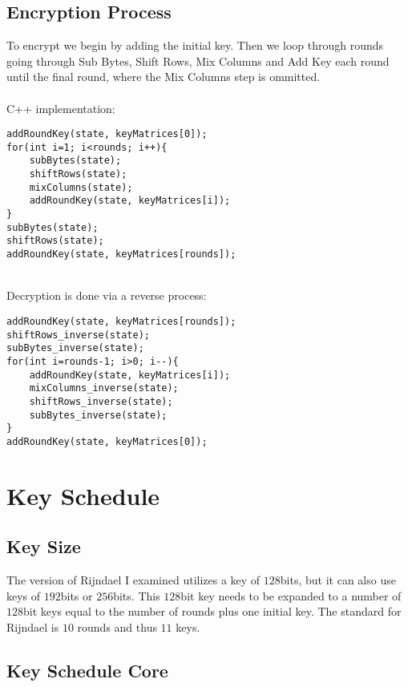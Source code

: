 \documentclass{article}
\begin{document}
\subsection{Encryption Process}
To encrypt we begin by adding the initial key.  Then we loop through rounds going through Sub Bytes, Shift Rows, Mix Columns and Add Key each round until the final round, where the Mix Columns step is ommitted.\\\\
C++ implementation:
\begin{lstlisting}
addRoundKey(state, keyMatrices[0]);
for(int i=1; i<rounds; i++){
    subBytes(state);
    shiftRows(state);
    mixColumns(state);
    addRoundKey(state, keyMatrices[i]);
}
subBytes(state);
shiftRows(state);
addRoundKey(state, keyMatrices[rounds]);
\end{lstlisting}
\hfill\\
Decryption is done via a reverse process:
\begin{lstlisting}
addRoundKey(state, keyMatrices[rounds]);
shiftRows_inverse(state);
subBytes_inverse(state);
for(int i=rounds-1; i>0; i--){
    addRoundKey(state, keyMatrices[i]);
    mixColumns_inverse(state);
    shiftRows_inverse(state);
    subBytes_inverse(state);
}
addRoundKey(state, keyMatrices[0]);
\end{lstlisting}

\section{Key Schedule}

\subsection{Key Size}

The version of Rijndael I examined utilizes a key of $128$bits, but it can also use keys of $192$bits or $256$bits.  This $128$bit key needs to be expanded to a number of $128$bit keys equal to the number of rounds plus one initial key.  The standard for Rijndael is $10$ rounds and thus $11$ keys.

\subsection{Key Schedule Core}
\end{document}
